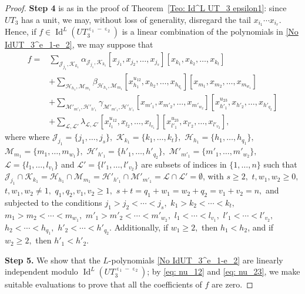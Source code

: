 \documentclass[10pt,a4paper]{amsart}
\DeclareMathOperator{\I}{Id}
\DeclareMathOperator{\e}{\varepsilon}
\begin{document}
\begin{proof}
\textbf{Step 4} is as in the proof of Theorem~\ref{Teo: Id^L UT_3 epsilon1}: since $UT_3$ has a
unit, we may, without loss of generality, disregard the tail $x_{i_1}\cdots x_{i_r}$. Hence, if  $f\in \I^L(UT_3^{\e_1-\e_2})$ is a linear combination of the polynomials in \eqref{No IdUT_3^e_1-e_2},   we may
suppose that
\begin{align*}
    f = &\sum_{\mathcal{J}_{j_1}, \mathcal{K}_{k_1}} \alpha_{ \mathcal{J}_{j_1}, \mathcal{K}_{k_1}} [x_{j_1},x_{j_2},\dots,x_{j_s}][x_{k_1},x_{k_2},\dots,x_{k_t}]\\
    &+ \sum_{ \mathcal{H}_{h_1}, \mathcal{M}_{m_1}}  \beta_{\mathcal{H}_{h_1}, \mathcal{M}_{m_1}} [x_{h_1}^{u_{12}},x_{h_2},\dots,x_{h_{q_1}}][x_{m_1},x_{m_2},\dots,x_{m_{w_1}}]\\
    &+ \sum_{ \mathcal{M}'_{m'_1}, \mathcal{H}'_{h'_1}}  \gamma_{ \mathcal{M}'_{m'_1}, \mathcal{H}'_{h'_1}}[x_{m'_1},x_{m'_2},\dots,x_{m'_{w_2}}][x_{h'_1}^{u_{23}},x_{h'_2},\dots,x_{h'_{q_2}}]\\
    &+ \sum_{\mathcal{L}, \mathcal{L}'}  \lambda_{\mathcal{L}, \mathcal{L}'}[x_{l_1}^{u_{12}},x_{l_2},\dots,x_{l_{v_1}}][x_{l'_1}^{u_{23}},x_{l'_2},\dots,x_{l'_{v_2}}],
\end{align*}
where where $\mathcal{J}_{j_1}=\{j_1,\ldots,j_s\},$ $\mathcal{K}_{k_1}=\{k_1,\ldots,k_t\},$ $\mathcal{H}_{h_1}=\{h_1,\ldots,h_{q_1}\},$ $\mathcal{M}_{m_1}=\{m_1,\ldots,m_{w_1}\},$ $\mathcal{H}'_{h'_1}=\{h'_1,\ldots,h'_{q_2}\},$ $\mathcal{M}'_{m'_1}=\{m'_1,\ldots,m'_{w_2}\},$ $\mathcal{L}=\{l_1,\ldots,l_{v_1}\}$ and $\mathcal{L}'=\{l'_1,\ldots,l'_{v_2}\}$
 are subsets of indices in $\{1,\ldots, n\}$ such that $\mathcal{J}_{j_1}\cap \mathcal{K}_{k_1}=\mathcal{H}_{h_1}\cap \mathcal{M}_{m_1}=\mathcal{H}'_{h'_1}\cap \mathcal{M}'_{m'_1}=\mathcal{L}\cap \mathcal{L}'=\emptyset$, with
$s\geq 2,$ $t, w_1,w_2\geq 0,$ $t,w_1,w_2\neq 1,$ $q_1,q_2,v_1,v_2\geq 1,$ $s+t=q_1+w_1=w_2+q_2=v_1+v_2=n,$ and subjected  to the conditions $j_1>j_2<  \cdots < j_s,$ $k_1>k_2<  \cdots < k_t,$ $m_1> m_2< \cdots < m_{w_1},$ $m'_1> m'_2< \cdots < m'_{w_2},$
$l_1< \cdots < l_{v_1},$ $l'_1< \cdots < l'_{v_2},$ $h_2< \cdots <h_{q_1},$ $h'_2< \cdots <h'_{q_2}.$ Additionally, if $w_1\geq 2,$ then $h_1< h_2$, and  if $w_2\geq 2,$ then $h'_1< h'_2.$



\textbf{Step 5.} We show that the $L$-polynomials \eqref{No IdUT_3^e_1-e_2} are linearly independent modulo
$\I^L(UT_3^{\e_1-\e_2})$; by \eqref{eq: nu_12} and \eqref{eq: nu_23}, we make suitable evaluations
to prove that all the coefficients of $f$ are zero.


\end{proof}
\end{document}
